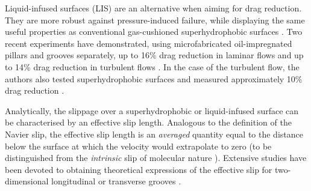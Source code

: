 Liquid-infused surfaces (LIS) are an alternative when aiming for drag reduction. They are more robust against pressure-induced failure, while displaying the same useful properties as conventional gas-cushioned superhydrophobic surfaces \citep{Wexler}. Two recent experiments have demonstrated, using microfabricated oil-impregnated pillars and grooves separately, up to 16\% drag reduction in laminar flows \citep{Solomon} and up to 14\% drag reduction in turbulent flows \citep{Rosenberg}. In the case of the turbulent flow, the authors also tested superhydrophobic surfaces and measured approximately 10\% drag reduction \citep{Rosenberg}.

Analytically, the slippage over a superhydrophobic or liquid-infused surface can be characterised by an effective slip length. Analogous to the definition of the Navier slip, the effective slip length is an \textit{averaged} quantity equal to the distance below the surface at which the velocity would extrapolate to zero (to be distinguished from the \textit{intrinsic} slip of molecular nature \citep{Gentili}). Extensive studies have been devoted to obtaining theoretical expressions of the effective slip for two-dimensional longitudinal or transverse grooves \citep{Lauga_Stone, Sbragalia_Prosperetti, Davis_Lauga, Ng_Wang, Schonecker, Nizkaya, Crowdy_long, Crowdy_tran}.

